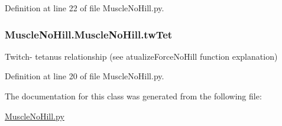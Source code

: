 Definition at line 22 of file Muscle\+No\+Hill.\+py.

\subsubsection[{\texorpdfstring{tw\+Tet}{twTet}}]{\setlength{\rightskip}{0pt plus 5cm}Muscle\+No\+Hill.\+Muscle\+No\+Hill.\+tw\+Tet}\hypertarget{class_muscle_no_hill_1_1_muscle_no_hill_a29798f6bca2f69e68f1421847d5327d8}{}\label{class_muscle_no_hill_1_1_muscle_no_hill_a29798f6bca2f69e68f1421847d5327d8}


Twitch-\/ tetanus relationship (see atualize\+Force\+No\+Hill function explanation) 



Definition at line 20 of file Muscle\+No\+Hill.\+py.



The documentation for this class was generated from the following file\+:\begin{DoxyCompactItemize}
\item 
\hyperlink{_muscle_no_hill_8py}{Muscle\+No\+Hill.\+py}\end{DoxyCompactItemize}
